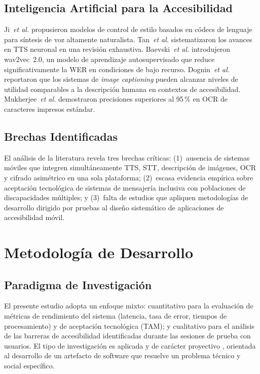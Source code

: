 \documentclass[journal]{IEEEtran}
\begin{document}
\subsection{Inteligencia Artificial para la Accesibilidad}

Ji~\textit{et al.} \cite{ji2024} propusieron modelos de control de estilo basados en c\'odecs de lenguaje para s\'intesis de voz altamente naturalista. Tan~\textit{et al.} \cite{tan2021} sistematizaron los avances en TTS neuronal en una revisi\'on exhaustiva. Baevski~\textit{et al.} \cite{baevski2020} introdujeron wav2vec~2.0, un modelo de aprendizaje autosupervisado que reduce significativamente la WER en condiciones de bajo recurso. Dognin~\textit{et al.} \cite{dognin2021} reportaron que los sistemas de \textit{image captioning} pueden alcanzar niveles de utilidad comparables a la descripci\'on humana en contextos de accesibilidad. Mukherjee~\textit{et al.} \cite{mukherjee2023} demostraron precisiones superiores al 95\,\% en OCR de caracteres impresos est\'andar.

\subsection{Brechas Identificadas}

El an\'alisis de la literatura revela tres brechas cr\'iticas: (1)~ausencia de sistemas m\'oviles que integren simult\'aneamente TTS, STT, descripci\'on de im\'agenes, OCR y cifrado asim\'etrico en una sola plataforma; (2)~escasa evidencia emp\'irica sobre aceptaci\'on tecnol\'ogica de sistemas de mensajer\'ia inclusiva con poblaciones de discapacidades m\'ultiples; y (3)~falta de estudios que apliquen metodolog\'ias de desarrollo dirigido por pruebas al dise\~no sistem\'atico de aplicaciones de accesibilidad m\'ovil.

\section{Metodolog\'ia de Desarrollo}
\label{sec:metodologia}

\subsection{Paradigma de Investigaci\'on}

El presente estudio adopta un enfoque mixto: cuantitativo para la evaluaci\'on de m\'etricas de rendimiento del sistema (latencia, tasa de error, tiempos de procesamiento) y de aceptaci\'on tecnol\'ogica (TAM); y cualitativo para el an\'alisis de las barreras de accesibilidad identificadas durante las sesiones de prueba con usuarios. El tipo de investigaci\'on es aplicada y de car\'acter proyectivo \cite{hernandez2014}, orientada al desarrollo de un artefacto de software que resuelve un problema t\'ecnico y social espec\'ifico.
\end{document}
